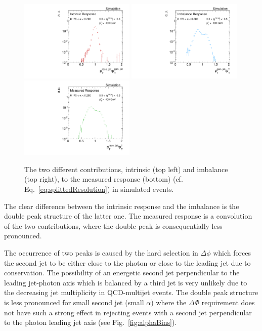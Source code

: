 \begin{figure}[b]
 \centering
     \includegraphics[width=0.49\textwidth]{figures/resolution/methodology/intrinsicResponse_6_alpha_bin.pdf}
     \includegraphics[width=0.49\textwidth]{figures/resolution/methodology/imbalanceResponse_6_alpha_bin.pdf}\\
     \includegraphics[width=0.49\textwidth]{figures/resolution/methodology/fullResponse_6_alpha_bin.pdf}
  \caption{The two different contributions, intrinsic (top left) and imbalance (top right), to the measured response (bottom) (cf. Eq.~\eqref{eq:splittedResolution}) in simulated events.}  
 \label{fig:responseExamples}
\end{figure}


The clear difference between the intrinsic response and the imbalance is the double peak structure of the latter one. The measured response is a convolution of the two
contributions, where the double peak is consequentially less pronounced.

The occurrence of two peaks is caused by the hard selection in $\Delta \phi$ which forces the second jet to be either close to the photon or close to the leading jet 
due to \pt conservation. 
The possibility of an energetic second jet perpendicular to the leading jet-photon axis which is balanced by a third jet is very unlikely 
due to the decreasing jet multiplicity in QCD-multijet events.
The double peak structure is less pronounced for small second jet \pt (small $\alpha$) where the $\Delta \Phi$ requirement does not have such a strong effect in rejecting
events with a second jet perpendicular to the photon leading jet axis (see \mbox{Fig. \ref{fig:alphaBins}}).

